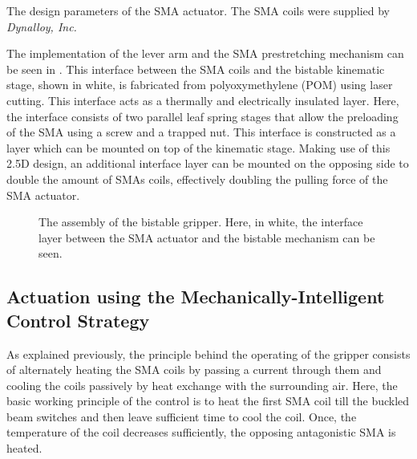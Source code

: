 \begin{table}[hbt!]
    \centering
    \caption{The design parameters of the SMA actuator. The SMA coils were supplied by \textit{Dynalloy, Inc.}}
    \label{tab:sma-design-parameters}
    
\end{table}

The implementation of the lever arm and the SMA prestretching mechanism can be seen in \todocite. This interface between the SMA coils and the bistable kinematic stage, shown in white, is fabricated from polyoxymethylene (POM) using laser cutting. This interface acts as a thermally and electrically insulated layer. Here, the interface consists of two parallel leaf spring stages that allow the preloading of the SMA using a screw and a trapped nut. This interface is constructed as a layer which can be mounted on top of the kinematic stage. Making use of this 2.5D design, an additional interface layer can be mounted on the opposing side to double the amount of SMAs coils, effectively doubling the pulling force of the SMA actuator.

\begin{figure}[hbt!] %
  \centering
  
  \caption{The assembly of the bistable gripper. Here, in white, the interface layer between the SMA actuator and the bistable mechanism can be seen.}
  \label{fig:assembly-gripper}
\end{figure}

\subsection{Actuation using the Mechanically-Intelligent Control Strategy}
As explained previously, the principle behind the operating of the gripper consists of alternately heating the SMA coils by passing a current through them and cooling the coils passively by heat exchange with the surrounding air. Here, the basic working principle of the control is to heat the first SMA coil till the buckled beam switches and then leave sufficient time to cool the coil. Once, the temperature of the coil decreases sufficiently, the opposing antagonistic SMA is heated.

